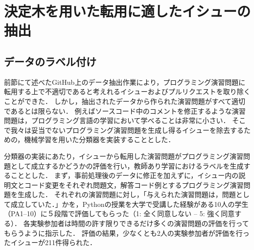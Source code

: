   
\section{決定木を用いた転用に適したイシューの抽出}

\subsection{データのラベル付け}
前節にて述べたGitHub上のデータ抽出作業により，プログラミング演習問題に転用する上で不適切であると考えれるイシューおよびプルリクエストを取り除くことができた．
しかし，抽出されたデータから作られた演習問題がすべて適切であるとは限らない．
例えばソースコード中のコメントを修正するような演習問題は，プログラミング言語の学習において学べることは非常に小さい．
そこで我々は妥当でないプログラミング演習問題を生成し得るイシューを除去するための，機械学習を用いた分類器を実装することとした．


分類器の実装にあたり，イシューから転用した演習問題がプログラミング演習問題として成立するかどうかの評価を行い，教師あり学習におけるラベルを生成することとした．
まず，事前処理後のデータに修正を加えずに，イシュー内の説明文とコード変更をそれぞれ問題文，解答コード例とするプログラミング演習問題を生成した．
それぞれの演習問題に対し，「与えられた演習問題は，問題として成立していた．」かを，Pythonの授業を大学で受講した経験がある10人の学生（PA1--10）に５段階で評価してもらった（1: 全く同意しない -- 5: 強く同意する）．
各実験参加者は時間の許す限りできるだけ多くの演習問題の評価を行ってもらうように指示した．
評価の結果，少なくとも2人の実験参加者が評価を行ったイシューが211件得られた．


